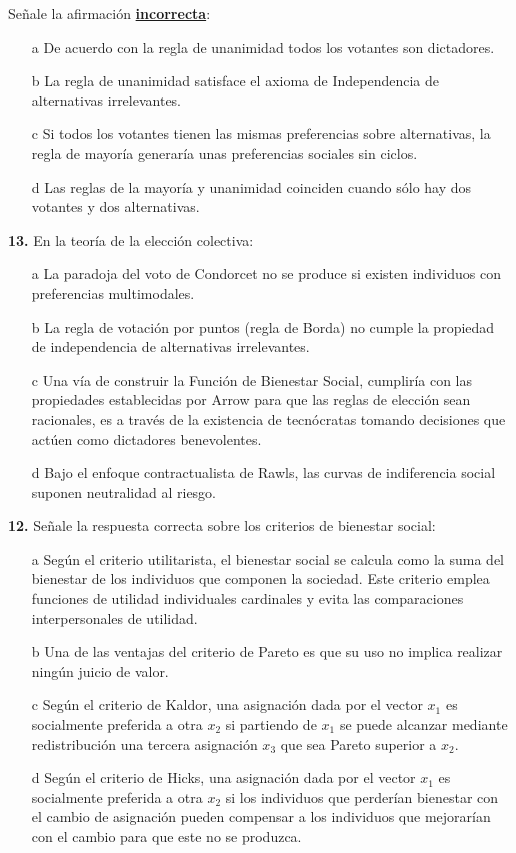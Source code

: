\documentclass{nuevotema}
\begin{document}
Señale la afirmación \textbf{\underline{incorrecta}}:

\begin{itemize}
	\item[a] De acuerdo con la regla de unanimidad todos los votantes son dictadores.
	\item[b] La regla de unanimidad satisface el axioma de Independencia de alternativas irrelevantes.
	\item[c] Si todos los votantes tienen las mismas preferencias sobre alternativas, la regla de mayoría generaría unas preferencias sociales sin ciclos.
	\item[d] Las reglas de la mayoría y unanimidad coinciden cuando sólo hay dos votantes y dos alternativas.
\end{itemize}


\textbf{13.} En la teoría de la elección colectiva:

\begin{itemize}
	\item[a] La paradoja del voto de Condorcet no se produce si existen individuos con preferencias multimodales.
	\item[b] La regla de votación por puntos (regla de Borda) no cumple la propiedad de independencia de alternativas irrelevantes.
	\item[c] Una vía de construir la Función de Bienestar Social, cumpliría con las propiedades establecidas por Arrow para que las reglas de elección sean racionales, es a través de la existencia de tecnócratas tomando decisiones que actúen como dictadores benevolentes.
	\item[d] Bajo el enfoque contractualista de Rawls, las curvas de indiferencia social suponen neutralidad al riesgo.
\end{itemize}


\textbf{12.} Señale la respuesta correcta sobre los criterios de bienestar social:

\begin{itemize}
	\item[a] Según el criterio utilitarista, el bienestar social se calcula como la suma del bienestar de los individuos que componen la sociedad. Este criterio emplea funciones de utilidad individuales cardinales y evita las comparaciones interpersonales de utilidad. 
	\item[b] Una de las ventajas del criterio de Pareto es que su uso no implica realizar ningún juicio de valor.
	\item[c] Según el criterio de Kaldor, una asignación dada por el vector $x_1$ es socialmente preferida a otra $x_2$ si partiendo de $x_1$ se puede alcanzar mediante redistribución una tercera asignación $x_3$ que sea Pareto superior a $x_2$.
	\item[d] Según el criterio de Hicks, una asignación dada por el vector $x_1$ es socialmente preferida a otra $x_2$ si los individuos que perderían bienestar con el cambio de asignación pueden compensar a los individuos que mejorarían con el cambio para que este no se produzca.
\end{itemize}
\end{document}
